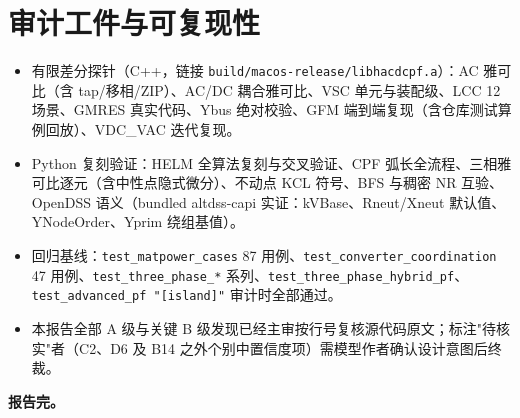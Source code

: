 \documentclass[11pt,a4paper,fontset=fandol]{ctexart}
\newcommand{\file}[1]{\texttt{#1}}
\begin{document}
\section{审计工件与可复现性}

\begin{itemize}
  \item 有限差分探针（C++，链接 \file{build/macos-release/libhacdcpf.a}）：AC 雅可比（含 tap/移相/ZIP）、AC/DC 耦合雅可比、VSC 单元与装配级、LCC 12 场景、GMRES 真实代码、Ybus 绝对校验、GFM 端到端复现（含仓库测试算例回放）、VDC\_VAC 迭代复现。
  \item Python 复刻验证：HELM 全算法复刻与交叉验证、CPF 弧长全流程、三相雅可比逐元（含中性点隐式微分）、不动点 KCL 符号、BFS 与稠密 NR 互验、OpenDSS 语义（bundled altdss-capi 实证：kVBase、Rneut/Xneut 默认值、YNodeOrder、Yprim 绕组基值）。
  \item 回归基线：\file{test\_matpower\_cases} 87 用例、\file{test\_converter\_coordination} 47 用例、\file{test\_three\_phase\_*} 系列、\file{test\_three\_phase\_hybrid\_pf}、\file{test\_advanced\_pf "[island]"} 审计时全部通过。
  \item 本报告全部 A 级与关键 B 级发现已经主审按行号复核源代码原文；标注"待核实"者（C2、D6 及 B14 之外个别中置信度项）需模型作者确认设计意图后终裁。
\end{itemize}

\vspace{1.5em}
\noindent\textbf{报告完。}
\end{document}
